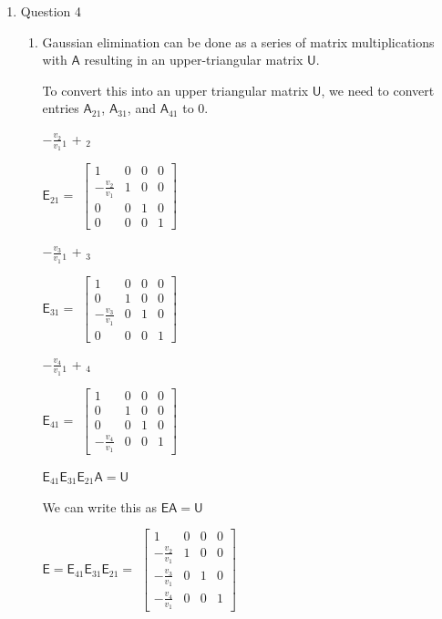\documentclass[a4paper, 11pt]{article}
\newcommand{\mat}[1]{\boldsymbol { \mathsf{#1}} }
\begin{document}
\begin{enumerate}
\item Question 4
\begin{enumerate}[label=(\alph*)]

\item Gaussian elimination can be done as a series of matrix multiplications with $\mat{A}$ resulting in an upper-triangular matrix $\mat{U}$. 

To convert this into an upper triangular matrix $\mat{U}$, we need to convert entries $\mat{A}_{21}$, $\mat{A}_{31}$, and $\mat{A}_{41}$ to 0.

$-\frac{v_2}{v_1}$\textscr$_1$ + \textscr$_2$

$\mat{E}_{21} = $
$\begin{bmatrix} 
       1 & 0 & 0 & 0 \\ 
       -\frac{v_2}{v_1} & 1 & 0 & 0 \\
       0 & 0 & 1 & 0 \\
       0 & 0 & 0 & 1 
\end{bmatrix}$

$-\frac{v_3}{v_1}$\textscr$_1$ + \textscr$_3$

$\mat{E}_{31} = $
$\begin{bmatrix} 
       1 & 0 & 0 & 0 \\ 
       0 & 1 & 0 & 0 \\
       -\frac{v_3}{v_1} & 0 & 1 & 0 \\
       0 & 0 & 0 & 1 
\end{bmatrix}$

$-\frac{v_4}{v_1}$\textscr$_1$ + \textscr$_4$

$\mat{E}_{41} = $
$\begin{bmatrix} 
       1 & 0 & 0 & 0 \\ 
       0 & 1 & 0 & 0 \\
       0 & 0 & 1 & 0 \\
       -\frac{v_4}{v_1} & 0 & 0 & 1
\end{bmatrix}$

$\mat{E}_{41}\mat{E}_{31}\mat{E}_{21}\mat{A} = \mat{U}$

We can write this as $\mat{E}\mat{A} = \mat{U}$ 

$\mat{E} = \mat{E}_{41}\mat{E}_{31}\mat{E}_{21} = $
$\begin{bmatrix} 
       1 & 0 & 0 & 0 \\ 
       -\frac{v_2}{v_1} & 1 & 0 & 0 \\
       -\frac{v_3}{v_1} & 0 & 1 & 0 \\
       -\frac{v_4}{v_1} & 0 & 0 & 1 
\end{bmatrix}$


\end{enumerate}
\end{enumerate}
\end{document}
